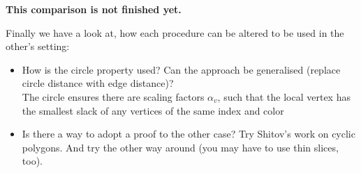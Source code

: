 \textbf{This comparison is not finished yet.}

Finally we have a look at, how each procedure can be altered to be used in the other's setting:

\begin{itemize}
  \item How is the circle property used? Can the approach be generalised (replace circle distance with edge distance)?\\
  The circle ensures there are scaling factors $\alpha_v$, such that the local vertex has the smallest slack of any vertices of the same index and color
  \item Is there a way to adopt a proof to the other case? Try Shitov's work on cyclic polygons. And try the other way around (you may have to use thin slices, too).
\end{itemize}
